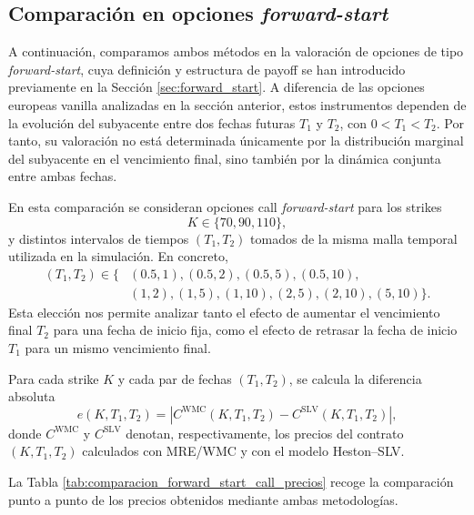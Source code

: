 \subsection{Comparación en opciones \textit{forward-start}}

A continuación, comparamos ambos métodos en la valoración de opciones de tipo
\textit{forward-start}, cuya definición y estructura de payoff se han introducido
previamente en la Sección \ref{sec:forward_start}. A diferencia de las opciones
europeas vanilla analizadas en la sección anterior, estos instrumentos dependen
de la evolución del subyacente entre dos fechas futuras \(T_1\) y \(T_2\), con
\(0<T_1<T_2\). Por tanto, su valoración no está determinada únicamente por la
distribución marginal del subyacente en el vencimiento final, sino también por la dinámica conjunta entre ambas fechas.\medskip

En esta comparación se consideran opciones call \textit{forward-start} para los strikes
\[
K \in \{70,90,110\},
\]
y distintos intervalos de tiempos \((T_1,T_2)\) tomados de la misma malla temporal
utilizada en la simulación. En concreto,
\[
\begin{aligned}
(T_1,T_2) \in \{&
(0.5,1),(0.5,2),(0.5,5),(0.5,10),\\
&(1,2),(1,5),(1,10),(2,5),(2,10),(5,10)\}.
\end{aligned}
\]
Esta elección nos permite analizar tanto el efecto de aumentar el vencimiento final
\(T_2\) para una fecha de inicio fija, como el efecto de retrasar la fecha de inicio
\(T_1\) para un mismo vencimiento final.\medskip

Para cada strike \(K\) y cada par de fechas \((T_1,T_2)\), se calcula la diferencia absoluta
\[
e(K,T_1,T_2)
=
\left|
C^{\mathrm{WMC}}(K,T_1,T_2)
-
C^{\mathrm{SLV}}(K,T_1,T_2)
\right|,
\]
donde \(C^{\mathrm{WMC}}\) y \(C^{\mathrm{SLV}}\) denotan, respectivamente, los
precios del contrato \((K,T_1,T_2)\) calculados con MRE/WMC y con el modelo
Heston--SLV.

La Tabla \ref{tab:comparacion_forward_start_call_precios} recoge la comparación
punto a punto de los precios obtenidos mediante ambas metodologías.

